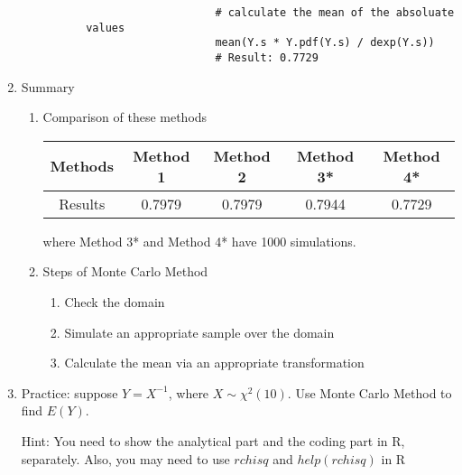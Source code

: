 \begin{enumerate}
\begin{enumerate}
\begin{enumerate}
\begin{itemize}
\begin{verbatim}
					# calculate the mean of the absoluate values
					mean(Y.s * Y.pdf(Y.s) / dexp(Y.s))
					# Result: 0.7729
					\end{verbatim}
				\end{itemize}
			\end{enumerate}
		\end{enumerate}
	\item Summary
		\begin{enumerate}
			\item Comparison of these methods
			\begin{center}
				\begin{tabular}{c | c | c | c | c}
					Methods & Method 1 & Method 2 & Method 3* & Method 4* \\
					\hline
					Results & 0.7979 & 0.7979 & 0.7944 & 0.7729
				\end{tabular}
			\end{center}
			where Method 3* and Method 4* have 1000 simulations.
			\item Steps of Monte Carlo Method
			\begin{enumerate}
				\item Check the domain
				\item Simulate an appropriate sample over the domain 
				\item Calculate the mean via an appropriate transformation
			\end{enumerate}
		\end{enumerate}
	\item Practice: suppose $Y = X^{-1}$, where $X \sim \chi^2(10)$. Use Monte Carlo Method to find $E(Y)$.
	\par Hint: You need to show the analytical part and the coding part in R, separately. Also, you may need to use $rchisq$ and $help(rchisq)$ in R
\end{enumerate}

\newpage
